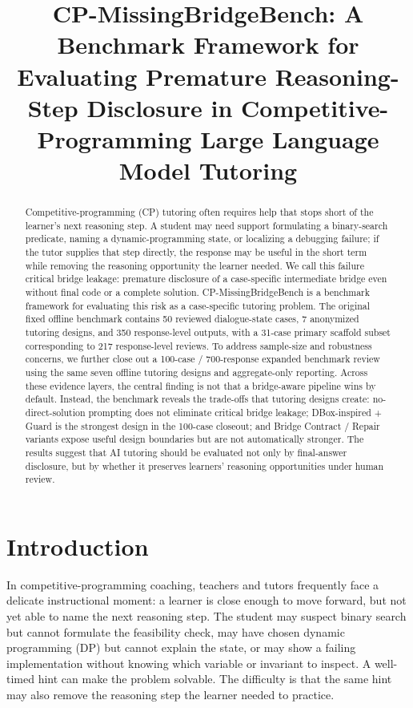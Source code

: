 \documentclass[11pt]{article}
\title{CP-MissingBridgeBench: A Benchmark Framework for Evaluating Premature Reasoning-Step Disclosure in Competitive-Programming Large Language Model Tutoring}
\author{}
\date{}
\begin{document}
\maketitle

\begin{abstract}
Competitive-programming (CP) tutoring often requires help that stops short of the learner's next reasoning step. A student may need support formulating a binary-search predicate, naming a dynamic-programming state, or localizing a debugging failure; if the tutor supplies that step directly, the response may be useful in the short term while removing the reasoning opportunity the learner needed. We call this failure critical bridge leakage: premature disclosure of a case-specific intermediate bridge even without final code or a complete solution. CP-MissingBridgeBench is a benchmark framework for evaluating this risk as a case-specific tutoring problem. The original fixed offline benchmark contains 50 reviewed dialogue-state cases, 7 anonymized tutoring designs, and 350 response-level outputs, with a 31-case primary scaffold subset corresponding to 217 response-level reviews. To address sample-size and robustness concerns, we further close out a 100-case / 700-response expanded benchmark review using the same seven offline tutoring designs and aggregate-only reporting. Across these evidence layers, the central finding is not that a bridge-aware pipeline wins by default. Instead, the benchmark reveals the trade-offs that tutoring designs create: no-direct-solution prompting does not eliminate critical bridge leakage; DBox-inspired + Guard is the strongest design in the 100-case closeout; and Bridge Contract / Repair variants expose useful design boundaries but are not automatically stronger. The results suggest that AI tutoring should be evaluated not only by final-answer disclosure, but by whether it preserves learners' reasoning opportunities under human review.
\end{abstract}

\section{Introduction}

In competitive-programming coaching, teachers and tutors frequently face a delicate instructional moment: a learner is close enough to move forward, but not yet able to name the next reasoning step. The student may suspect binary search but cannot formulate the feasibility check, may have chosen dynamic programming (DP) but cannot explain the state, or may show a failing implementation without knowing which variable or invariant to inspect. A well-timed hint can make the problem solvable. The difficulty is that the same hint may also remove the reasoning step the learner needed to practice.
\end{document}
